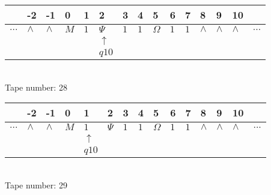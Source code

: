 \documentclass{article}
\begin{document}
\begin{table}[H]
\centering
\begin{tabular}{lllllllllllllll}
 & -2 & -1 & 0 & 1 & 2 & 3 & 4 & 5 & 6 & 7 & 8 & 9 & 10 & \\
\hline
$...$ & \multicolumn{1}{|l|}{$\wedge$} & \multicolumn{1}{|l|}{$\wedge$} & \multicolumn{1}{|l|}{$M$} & \multicolumn{1}{|l|}{$1$} & \multicolumn{1}{|l|}{$\Psi$} & \multicolumn{1}{|l|}{$1$} & \multicolumn{1}{|l|}{$1$} & \multicolumn{1}{|l|}{$\Omega$} & \multicolumn{1}{|l|}{$1$} & \multicolumn{1}{|l|}{$1$} & \multicolumn{1}{|l|}{$\wedge$} & \multicolumn{1}{|l|}{$\wedge$} & \multicolumn{1}{|l|}{$\wedge$} & $...$\\
\hline
&  &  &  &  & $\uparrow$ &  &  &  &  &  &  &  &  &  \\
&  &  &  &  & $ q10 $ &  &  &  &  &  &  &  &  &  \\
\end{tabular}
\\
Tape number: 28
\noindent\makebox[\linewidth]{\hdashrule{\textwidth}{1pt}{1pt}}\end{table}

\begin{table}[H]
\centering
\begin{tabular}{lllllllllllllll}
 & -2 & -1 & 0 & 1 & 2 & 3 & 4 & 5 & 6 & 7 & 8 & 9 & 10 & \\
\hline
$...$ & \multicolumn{1}{|l|}{$\wedge$} & \multicolumn{1}{|l|}{$\wedge$} & \multicolumn{1}{|l|}{$M$} & \multicolumn{1}{|l|}{$1$} & \multicolumn{1}{|l|}{$\Psi$} & \multicolumn{1}{|l|}{$1$} & \multicolumn{1}{|l|}{$1$} & \multicolumn{1}{|l|}{$\Omega$} & \multicolumn{1}{|l|}{$1$} & \multicolumn{1}{|l|}{$1$} & \multicolumn{1}{|l|}{$\wedge$} & \multicolumn{1}{|l|}{$\wedge$} & \multicolumn{1}{|l|}{$\wedge$} & $...$\\
\hline
&  &  &  & $\uparrow$ &  &  &  &  &  &  &  &  &  &  \\
&  &  &  & $ q10 $ &  &  &  &  &  &  &  &  &  &  \\
\end{tabular}
\\
Tape number: 29
\noindent\makebox[\linewidth]{\hdashrule{\textwidth}{1pt}{1pt}}\end{table}
\end{document}
